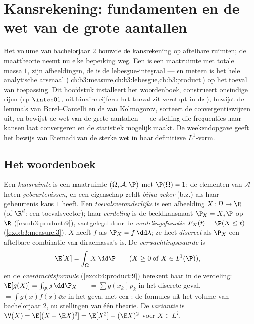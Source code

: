 \chapter{Kansrekening: fundamenten en de wet van de grote
aantallen}\label{ch:b3:probability}

Het volume van bachelorjaar 2 bouwde de kansrekening op
aftelbare ruimten; de maattheorie neemt nu elke beperking weg.
Een  is een maatruimte met totale massa $1$,
 zijn  afbeeldingen, de
 is de lebesgue-integraal --- en meteen is het
hele analytische arsenaal
(\cref{ch:b3:measure,ch:b3:lebesgue,ch:b3:product}) op het toeval
van toepassing. Dit hoofdstuk installeert het woordenboek,
construeert oneindige rijen  
(op $\intcc01$, uit binaire cijfers: het toeval zit verstopt in
de ), bewijst de lemma's van Borel--Cantelli en de
 van Kolmogorov, sorteert de convergentiewijzen uit,
en bewijst de wet van de grote aantallen --- de stelling die
frequenties naar kansen laat convergeren en de statistiek
mogelijk maakt. De weekendopgave geeft het bewijs van Etemadi van
de sterke wet in haar definitieve $L^1$-vorm.

\section{Het woordenboek}

\begin{definition}\label{def:b3:probability:space}
Een \emph{kansruimte} is een maatruimte
$(\Omega, \mathcal A, \P)$ met $\P(\Omega) = 1$; de elementen van
$\mathcal A$ heten \emph{gebeurtenissen}, en een eigenschap geldt
\emph{bijna zeker} (b.z.) als haar gebeurtenis kans $1$ heeft.
Een \emph{toevalsveranderlijke} is
een  afbeelding $X \colon \Omega \to \R$ (of $\R^d$: een
toevalsvector); haar \emph{verdeling} is de beeldkansmaat $\P_X = X_*\P$ op $\R$
(\cref{exo:b3:product:9}), vastgelegd door de
\emph{verdelingsfunctie} $F_X(t) = \P(X \leq t)$
(\cref{exo:b3:measure:3}). $X$ heeft \emph{} $f$ als
$\P_X = f\,\dd\lambda$; ze heet \emph{discreet} als $\P_X$ een
aftelbare combinatie van diracmassa's is. De
\emph{verwachtingswaarde} is
\[
\E[X] = \int_\Omega X\,\dd\P
\qquad (X \geq 0 \text{ of } X \in L^1(\P)),
\]
en de \emph{overdrachtsformule} (\cref{exo:b3:product:9})
berekent haar in de verdeling: $\E[g(X)] = \int_\R g\,\dd\P_X$
--- $= \sum g(x_k)p_k$ in het discrete geval, $= \int
g(x)f(x)\dd x$ in het geval met een : de formules uit
het volume van bachelorjaar 2, nu stellingen van één theorie. De
\emph{variantie} is $\V(X) = \E[(X - \E X)^2] = \E[X^2] - (\E
X)^2$ voor $X \in L^2$.
\end{definition}

